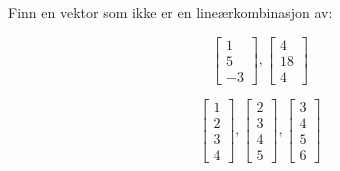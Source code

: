 \begin{oppgave}
Finn en vektor som ikke er en lineærkombinasjon av:
\begin{punkt}
	$$
	\begin{bmatrix}
	1\\
	5\\
	-3
	\end{bmatrix},
	\begin{bmatrix}
	4\\
	18\\
	4
	\end{bmatrix}
	$$
\end{punkt}
\begin{punkt}
$$
\begin{bmatrix}
1\\
2\\
3\\
4
\end{bmatrix},
\begin{bmatrix}
2\\
3\\
4\\
5
\end{bmatrix},
\begin{bmatrix}
3\\
4\\
5\\
6
\end{bmatrix}
$$
\end{punkt}
\end{oppgave}

